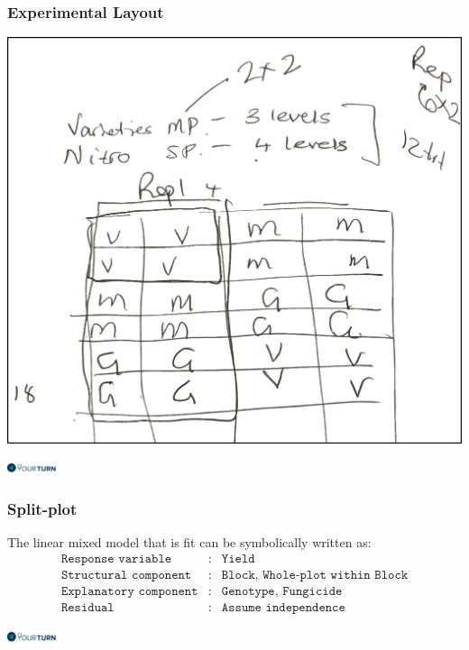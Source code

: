 \begin{frame}\frametitle{Experimental Layout}

\begin{center}
\includegraphics[height = 0.7\textheight]{exptlayout.png}
\end{center}
\flushright
\includegraphics[height = 0.3cm]{yourturn}
\end{frame}


\begin{frame}\frametitle{Split-plot}
The linear mixed model that is fit can be symbolically written as:
\begin{eqnarray*}
	\texttt{Response variable}&:& \texttt{Yield} \\
	\texttt{Structural component}&:& \texttt{Block, Whole-plot within Block}\\
	\texttt{Explanatory component}&:& \texttt{Genotype, Fungicide}\\
	\texttt{Residual}&:& \texttt{Assume independence}
\end{eqnarray*}

\vspace{1cm}
\flushright
\includegraphics[height = 0.3cm]{yourturn}
\end{frame}

